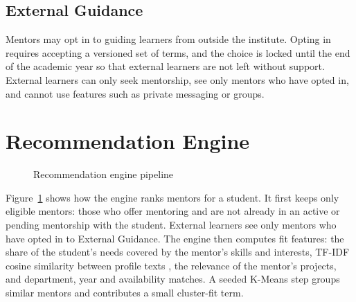 \documentclass[12pt,a4paper]{report}
\begin{document}
\subsection{External Guidance}
Mentors may opt in to guiding learners from outside the institute. Opting in requires accepting a versioned set of terms, and the choice is locked until the end of the academic year so that external learners are not left without support. External learners can only seek mentorship, see only mentors who have opted in, and cannot use features such as private messaging or groups.

\section{Recommendation Engine}
\begin{figure}[h]
\centering
{}
\caption{Recommendation engine pipeline}
\label{fig:engine}
\end{figure}

Figure~\ref{fig:engine} shows how the engine ranks mentors for a student. It first keeps only eligible mentors: those who offer mentoring and are not already in an active or pending mentorship with the student. External learners see only mentors who have opted in to External Guidance. The engine then computes fit features: the share of the student's needs covered by the mentor's skills and interests, TF-IDF cosine similarity between profile texts \cite{salton1988}, the relevance of the mentor's projects, and department, year and availability matches. A seeded K-Means step groups similar mentors and contributes a small cluster-fit term.
\end{document}
